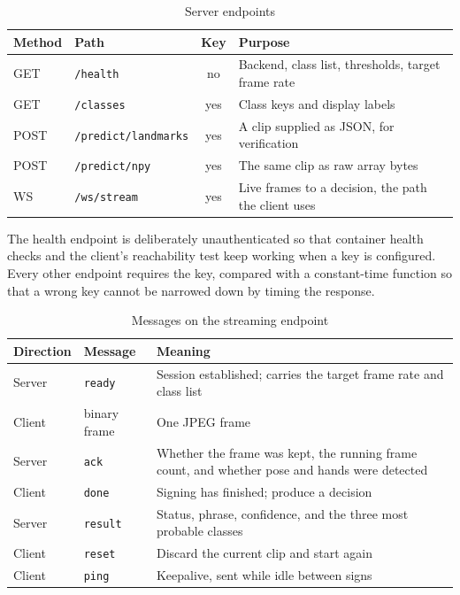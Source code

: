 \begin{table}[htbp]
    \centering
    \caption{Server endpoints}
    \label{tab:endpoints}
    \small
    \begin{tabularx}{\textwidth}{|l|l|c|X|}
        \hline
        \textbf{Method} & \textbf{Path} & \textbf{Key} & \textbf{Purpose} \\
        \hline
        GET  & \texttt{/health}            & no  & Backend, class list, thresholds, target frame rate \\
        \hline
        GET  & \texttt{/classes}           & yes & Class keys and display labels \\
        \hline
        POST & \texttt{/predict/landmarks} & yes & A clip supplied as JSON, for verification \\
        \hline
        POST & \texttt{/predict/npy}       & yes & The same clip as raw array bytes \\
        \hline
        WS   & \texttt{/ws/stream}         & yes & Live frames to a decision, the path the client uses \\
        \hline
    \end{tabularx}
\end{table}

\noindent The health endpoint is deliberately unauthenticated so that container health checks and the client's reachability test keep working when a key is configured. Every other endpoint requires the key, compared with a constant-time function so that a wrong key cannot be narrowed down by timing the response.

\begin{table}[htbp]
    \centering
    \caption{Messages on the streaming endpoint}
    \label{tab:wsmessages}
    \small
    \begin{tabularx}{\textwidth}{|l|l|X|}
        \hline
        \textbf{Direction} & \textbf{Message} & \textbf{Meaning} \\
        \hline
        Server & \texttt{ready}     & Session established; carries the target frame rate and class list \\
        \hline
        Client & binary frame       & One JPEG frame \\
        \hline
        Server & \texttt{ack}       & Whether the frame was kept, the running frame count, and whether pose and hands were detected \\
        \hline
        Client & \texttt{done}      & Signing has finished; produce a decision \\
        \hline
        Server & \texttt{result}    & Status, phrase, confidence, and the three most probable classes \\
        \hline
        Client & \texttt{reset}     & Discard the current clip and start again \\
        \hline
        Client & \texttt{ping}      & Keepalive, sent while idle between signs \\
        \hline
    \end{tabularx}
\end{table}

